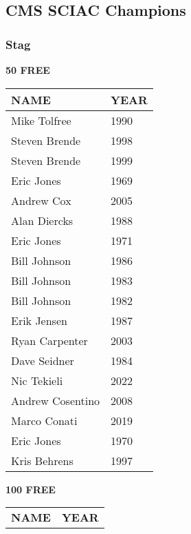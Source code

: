 
\newpage

\subsection{CMS SCIAC Champions}
\subsubsection{Stag}

\begin{table}[H]
\centering
\begin{minipage}[t]{0.48\textwidth}
\centering
\textbf{50 FREE}\\[0.1cm]
\begin{tabular}{@{}p{2.8cm}p{1.2cm}@{}}
\hline
    \textbf{NAME} & \textbf{YEAR} \\
\hline
    Mike Tolfree & 1990 \\
    Steven Brende & 1998 \\
    Steven Brende & 1999 \\
    Eric Jones & 1969 \\
    Andrew Cox & 2005 \\
    Alan Diercks & 1988 \\
    Eric Jones & 1971 \\
    Bill Johnson & 1986 \\
    Bill Johnson & 1983 \\
    Bill Johnson & 1982 \\
    Erik Jensen & 1987 \\
    Ryan Carpenter & 2003 \\
    Dave Seidner & 1984 \\
    Nic Tekieli & 2022 \\
    Andrew Cosentino & 2008 \\
    Marco Conati & 2019 \\
    Eric Jones & 1970 \\
    Kris Behrens & 1997 \\
\hline
\end{tabular}
\end{minipage}\hfill
\begin{minipage}[t]{0.48\textwidth}
\centering
\textbf{100 FREE}\\[0.1cm]
\begin{tabular}{@{}p{2.8cm}p{1.2cm}@{}}
\hline
    \textbf{NAME} & \textbf{YEAR} \\

\end{tabular}
\end{minipage}
\end{table}
